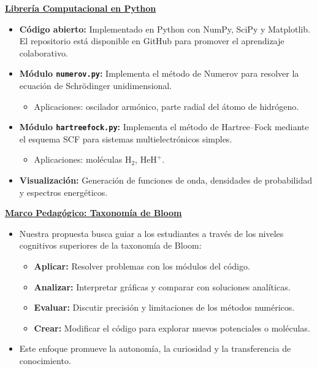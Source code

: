 \documentclass[archE1,portrait]{baposter}
\begin{document}
\begin{poster}
{\begin{minipage}[t]{0.48\linewidth}
\vspace{0pt}
\underline{\textbf{Librería Computacional en Python}}
\begin{itemize}
    \item \textbf{Código abierto:} Implementado en Python con NumPy, SciPy y Matplotlib. El repositorio está disponible en GitHub para promover el aprendizaje colaborativo.
    \item \textbf{Módulo \texttt{numerov.py}:} Implementa el método de Numerov para resolver la ecuación de Schrödinger unidimensional.
        \begin{itemize}
            \item Aplicaciones: oscilador armónico, parte radial del átomo de hidrógeno.
        \end{itemize}
    \item \textbf{Módulo \texttt{hartreefock.py}:} Implementa el método de Hartree–Fock mediante el esquema SCF para sistemas multielectrónicos simples.
        \begin{itemize}
            \item Aplicaciones: moléculas $\text{H}_2$, $\text{HeH}^+$.
        \end{itemize}
    \item \textbf{Visualización:} Generación de funciones de onda, densidades de probabilidad y espectros energéticos.
\end{itemize}
\end{minipage}
\hfill
\begin{minipage}[t]{0.48\linewidth}
\vspace{0pt}
\underline{\textbf{Marco Pedagógico: Taxonomía de Bloom}}
\begin{itemize}
    \item Nuestra propuesta busca guiar a los estudiantes a través de los niveles cognitivos superiores de la taxonomía de Bloom:
    \begin{itemize}
        \item \textbf{Aplicar:} Resolver problemas con los módulos del código.
        \item \textbf{Analizar:} Interpretar gráficas y comparar con soluciones analíticas.
        \item \textbf{Evaluar:} Discutir precisión y limitaciones de los métodos numéricos.
        \item \textbf{Crear:} Modificar el código para explorar nuevos potenciales o moléculas.
    \end{itemize}
    \item Este enfoque promueve la autonomía, la curiosidad y la transferencia de conocimiento.
\end{itemize}
\end{minipage}
}


\end{poster}
\end{document}
